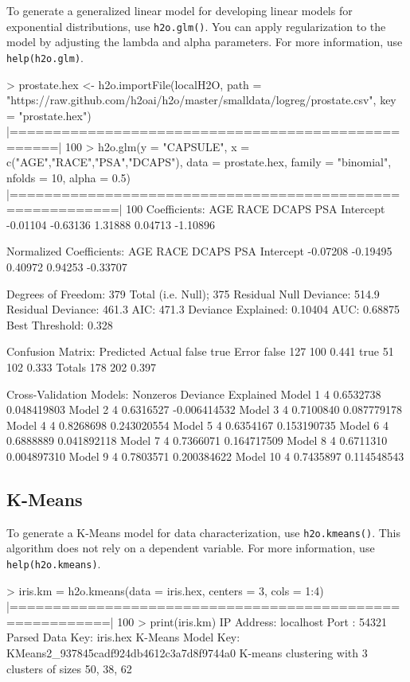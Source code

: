 \documentclass[11pt]{article}
\begin{document}
{To generate a generalized linear model for developing linear models for exponential distributions, use {\texttt{h2o.glm()}}. You can apply regularization to the model by adjusting the lambda and alpha parameters. 
For more information, use {\texttt{help(h2o.glm)}}.
\begin{spverbatim}
> prostate.hex <- h2o.importFile(localH2O, path =
"https://raw.github.com/h2oai/h2o/master/smalldata/logreg/prostate.csv",
key = "prostate.hex")
 |===================================================| 100%
> h2o.glm(y = "CAPSULE", x = c("AGE","RACE","PSA","DCAPS"), data =
prostate.hex, family = "binomial", nfolds = 10, alpha = 0.5)
 |==========================================================| 100%
    Coefficients:
    AGE          RACE     DCAPS       PSA   Intercept
    -0.01104  -0.63136   1.31888   0.04713  -1.10896

    Normalized Coefficients:
    AGE          RACE     DCAPS       PSA   Intercept
    -0.07208  -0.19495   0.40972   0.94253  -0.33707

    Degrees of Freedom: 379 Total (i.e. Null);  375 Residual
    Null Deviance:     514.9
    Residual Deviance: 461.3  AIC: 471.3
    Deviance Explained: 0.10404
    AUC: 0.68875  Best Threshold: 0.328
    
    Confusion Matrix:
            Predicted
    Actual   false true Error
      false    127  100 0.441
      true      51  102 0.333
      Totals   178  202 0.397

    Cross-Validation Models:
                Nonzeros               Deviance Explained
      Model 1      4       0.6532738      0.048419803
      Model 2      4       0.6316527     -0.006414532
      Model 3      4       0.7100840      0.087779178
      Model 4      4       0.8268698      0.243020554
      Model 5      4       0.6354167      0.153190735
      Model 6      4       0.6888889      0.041892118
      Model 7      4       0.7366071      0.164717509
      Model 8      4       0.6711310      0.004897310
      Model 9      4       0.7803571      0.200384622
      Model 10     4       0.7435897      0.114548543
\end{spverbatim}

\subsection{K-Means}

To generate a K-Means model for data characterization, use {\texttt{h2o.kmeans()}}. This algorithm does not rely on a dependent variable. For more information, use {\texttt{help(h2o.kmeans)}}.
\begin{spverbatim}
> iris.km = h2o.kmeans(data = iris.hex, centers = 3, cols = 1:4)
  |=========================================================| 100%
> print(iris.km)
IP Address: localhost 
Port      : 54321 
Parsed Data Key: iris.hex 
K-Means Model Key: KMeans2_937845cadf924db4612c3a7d8f9744a0
K-means clustering with 3 clusters of sizes 50, 38, 62


\end{spverbatim}}
\end{document}
